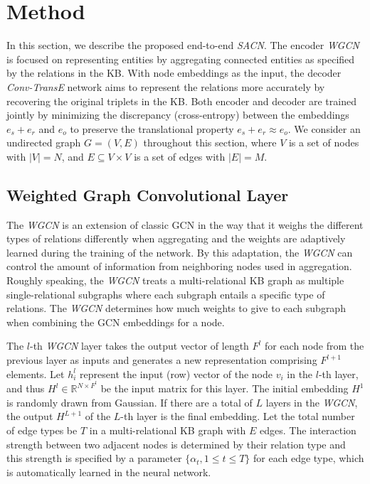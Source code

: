 \documentclass[letterpaper]{article} \usepackage{aaai19}  \usepackage{times}  \usepackage{helvet}  \usepackage{courier}  \usepackage{url}  \usepackage{graphicx}  \usepackage{amsmath}
\begin{document}
\section{Method}

In this section, we describe the proposed end-to-end {\it SACN}. The encoder {\it WGCN} is focused on representing entities by aggregating connected entities as specified by the relations in the KB. With node embeddings as the input, the decoder {\it Conv-TransE} network aims to represent the relations more accurately by recovering the original triplets in the KB. Both encoder and decoder are trained jointly by minimizing the discrepancy (cross-entropy) between the embeddings $e_s +e_r$ and $e_o$ to preserve the translational property $e_s +e_r \approx e_o$. We consider an undirected graph $G = (V, E)$ throughout this section, where $V$ is a set of nodes with $|V| = N$, and $E \subseteq V \times V$ is a set of edges with $|E| = M$. 

\subsection{Weighted Graph Convolutional Layer}
The {\it WGCN} is an extension of classic GCN \cite{kipf2016semi} in the way that it weighs the different types of relations differently when aggregating and the weights are adaptively learned during the training of the network. By this adaptation, the {\it WGCN} can control the amount of information from neighboring nodes used in aggregation. Roughly speaking, the {\it WGCN} treats a multi-relational KB graph as multiple single-relational subgraphs where each subgraph entails a specific type of relations. The {\it WGCN} determines how much weights to give to each subgraph when combining the GCN embeddings for a node. 

The $l$-th {\it WGCN} layer takes the output vector of length $F^{l}$ for each node from the previous layer as inputs and generates a new representation comprising $F^{l+1}$ elements. Let $h^{l}_i$ represent the input (row) vector of the node $v_i$ in the $l$-th layer, and thus $H^{l}\in {\mathbb{R}}^{N \times F^{l}}$ be the input matrix for this layer. The initial embedding $H^1$ is randomly drawn from Gaussian. If there are a total of $L$ layers in the {\it WGCN}, the output $H^{L+1}$ of the $L$-th layer is the final embedding.
Let the total number of edge types be $T$ in a multi-relational KB graph with $E$ edges.
The interaction strength between two adjacent nodes is determined by their relation type and this strength is specified by a parameter $\{\alpha_t, 1 \leq t \leq T\} $ for each edge type, which is automatically learned in the neural network. 
\end{document}
